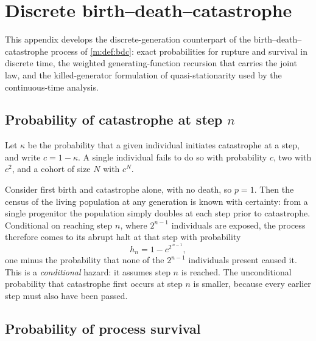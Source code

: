 \section{Discrete birth--death--catastrophe}
\label{m:app:dbdc}

This appendix develops the discrete-generation counterpart of the
birth--death--catastrophe process of \cref{m:def:bdc}: exact probabilities for
rupture and survival in discrete time, the weighted generating-function
recursion that carries the joint law, and the killed-generator formulation of
quasi-stationarity used by the continuous-time analysis.

\subsection*{Probability of catastrophe at step \texorpdfstring{$n$}{n}}

Let $\kappa$ be the probability that a given individual initiates catastrophe at
a step, and write $c = 1-\kappa$. A single individual fails to do so with
probability $c$, two with $c^2$, and a cohort of size $N$ with $c^N$.

Consider first birth and catastrophe alone, with no death, so $p=1$. Then the
census of the living population at any generation is known with certainty: from
a single progenitor the population simply doubles at each step prior to
catastrophe. Conditional on reaching step $n$, where $2^{n-1}$ individuals are
exposed, the process therefore comes to its abrupt halt at that step with
probability
\begin{equation}
\label{m:eq:bdchalt}
h_n = 1-c^{2^{\,n-1}},
\end{equation}
one minus the probability that none of the $2^{n-1}$ individuals present caused
it. This is a \emph{conditional} hazard: it assumes step $n$ is reached. The
unconditional probability that catastrophe first occurs at step $n$ is smaller,
because every earlier step must also have been passed.

\subsection*{Probability of process survival}

